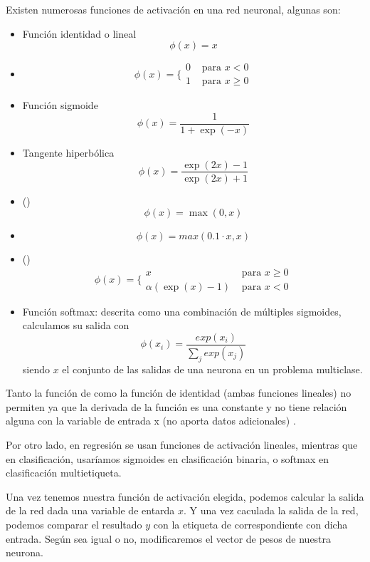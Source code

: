 \begin{enumerate}
        Existen numerosas funciones de activación en una red neuronal, algunas son:
        \begin{itemize}
          \item Función identidad o lineal \[\phi(x) = x\]
          \item {} \[\phi(x) = \lbrace\begin{array}{ll}0 & \text{ para } x<0 \\ 1 & \text{ para } x \geq 0\end{array}\]
          \item Función sigmoide \[\phi(x) = \frac{1}{1 + \exp(-x)}\]
          \item Tangente hiperbólica \[\phi(x) = \frac{\exp(2x) -1 }{\exp(2x) + 1}\]
          \item {} () \[\phi(x) = \max(0, x)\]
          \item {}  \[\phi(x) = max(0.1 \cdot x,x)\]
          \item {} () \[\phi(x) = \lbrace\begin{array}{ll}x & \text{ para } x \geq 0 \\ \alpha(\exp(x) - 1) & \text{ para } x < 0\end{array}\]
          \item Función softmax: descrita como una combinación de múltiples sigmoides, calculamos su salida con \[\phi(x_i) = \frac{exp(x_i)}{\sum_j exp(x_j)}\] siendo $x$ el conjunto de las salidas de una neurona en un problema multiclase.
        \end{itemize}

        Tanto la función de  como la función de identidad (ambas funciones lineales) no permiten  ya que la derivada de la función es una constante y no tiene relación alguna con la variable de entrada x (no aporta datos adicionales) .

        Por otro lado, en regresión se usan funciones de activación lineales, mientras que en clasificación, usaríamos sigmoides en clasificación binaria, o softmax en clasificación multietiqueta.

        Una vez tenemos nuestra función de activación elegida, podemos calcular la salida de la red dada una variable de entarda $x$. Y una vez caculada la salida de la red, podemos comparar el resultado $y$ con la etiqueta de  correspondiente con dicha entrada. Según sea igual o no, modificaremos el vector de pesos de nuestra neurona.


\end{enumerate}

